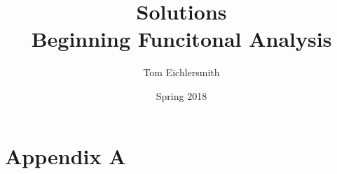 \documentclass{article}
\title{Solutions \\ Beginning Funcitonal Analysis}
\author{Tom Eichlersmith}
\date{Spring 2018}
\begin{document}
 
\maketitle
 
\section*{Appendix A}
 

 
\end{document}
